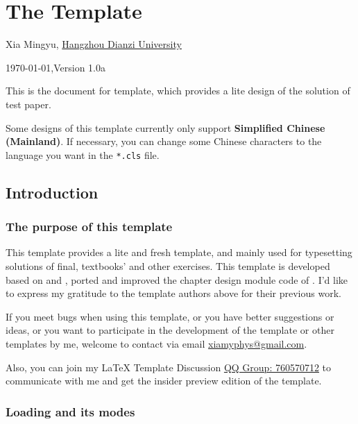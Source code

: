 \chapter{The  Template}
\fancyhead[R]{\color{H7}\rightmark\,}

\centerline{Xia Mingyu, \href{https://www.hdu.edu.cn}{Hangzhou Dianzi University}}
\ddmmyyyydate
\centerline{}
\centerline{\today,\quad Version 1.0a}

This is the document for  template, which provides a lite design of the solution of test paper.

Some designs of this template currently only support \textbf{Simplified Chinese (Mainland)}. If necessary, you can change some Chinese characters to the language you want in the \verb|*.cls| file.

\section{Introduction}
\subsection{The purpose of this template}
This template provides a lite and fresh template, and mainly used for typesetting solutions of final, textbooks' and other exercises. This template is developed based on  and \href{https://github.com/Azure1210/VividBooK}{}, ported and improved the chapter design module code of \href{https://www.overleaf.com/latex/templates/the-legrand-orange-book-template-english/jtctyfmnpppc}{}. I'd like to express my gratitude to the template authors above for their previous work.

If you meet bugs when using this template, or you have better suggestions or ideas, or you want to participate in the development of the template or other templates by me, welcome to contact via email \href{mailto:xiamyphys@gmail.com}{xiamyphys@gmail.com}.

Also, you can join my \textsf\LaTeX{} Template Discussion \href{https://qm.qq.com/q/OnHzbNvVAG}{QQ Group: 760570712} to communicate with me and get the insider preview edition of the template.

\subsection{Loading  and its modes}


